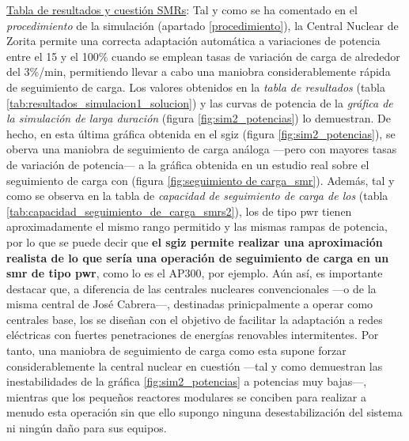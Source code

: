 \underline{Tabla de resultados y cuestión SMRs}: Tal y como se ha comentado en el \textit{procedimiento} de la simulación (apartado \ref{procedimiento}), la Central Nuclear de Zorita permite una correcta adaptación automática a variaciones de potencia entre el 15 y el 100\% cuando se emplean tasas de variación de carga de alrededor del 3\%/min, permitiendo llevar a cabo una maniobra considerablemente rápida de seguimiento de carga. Los valores obtenidos en la \textit{tabla de resultados} (tabla \ref{tab:resultados_simulacion1_solucion}) y las curvas de potencia de la \textit{gráfica de la simulación de larga duración} (figura \ref{fig:sim2_potencias}) lo demuestran. De hecho, en esta última gráfica obtenida en el \acrshort{sgiz} (figura \ref{fig:sim2_potencias}), se oberva una maniobra de seguimiento de carga análoga ---pero con mayores tasas de variación de potencia--- a la gráfica obtenida en un estudio real sobre el seguimiento de carga con  (figura \ref{fig:seguimiento de carga_smr}). Además, tal y como se observa en la tabla de \textit{capacidad de seguimiento de carga de los } (tabla \ref{tab:capacidad_seguimiento_de_carga_smrs2}), los  de tipo \acrshort{pwr} tienen aproximadamente el mismo rango permitido y las mismas rampas de potencia, por lo que se puede decir que \textbf{el \acrshort{sgiz} permite realizar una aproximación realista de lo que sería una operación de seguimiento de carga en un \acrshort{smr} de tipo \acrshort{pwr}}, como lo es el AP300, por ejemplo. Aún así, es importante destacar que, a diferencia de las centrales nucleares convencionales ---o de la misma central de José Cabrera---, destinadas prinicpalmente a operar como centrales base, los  se diseñan con el objetivo de facilitar la adaptación a redes eléctricas con fuertes penetraciones de energías renovables intermitentes. Por tanto, una maniobra de seguimiento de carga como esta supone forzar considerablemente la central nuclear en cuestión ---tal y como demuestran las inestabilidades de la gráfica \ref{fig:sim2_potencias} a potencias muy bajas---, mientras que los pequeños reactores modulares se conciben para realizar a menudo esta operación sin que ello supongo ninguna desestabilización del sistema ni ningún daño para sus equipos.

